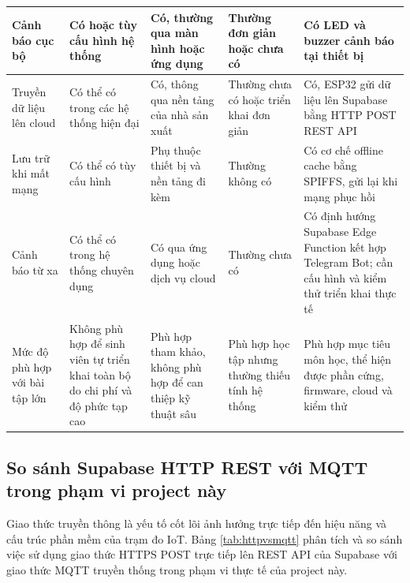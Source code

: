 \begin{table}[H]
\begin{tabularx}{\textwidth}{|p{3.2cm}|X|X|X|X|}
Cảnh báo cục bộ 
& Có hoặc tùy cấu hình hệ thống 
& Có, thường qua màn hình hoặc ứng dụng 
& Thường đơn giản hoặc chưa có 
& Có LED và buzzer cảnh báo tại thiết bị \\
\hline

Truyền dữ liệu lên cloud 
& Có thể có trong các hệ thống hiện đại 
& Có, thông qua nền tảng của nhà sản xuất 
& Thường chưa có hoặc triển khai đơn giản 
& Có, ESP32 gửi dữ liệu lên Supabase bằng HTTP POST REST API \\
\hline

Lưu trữ khi mất mạng 
& Có thể có tùy cấu hình 
& Phụ thuộc thiết bị và nền tảng đi kèm 
& Thường không có 
& Có cơ chế offline cache bằng SPIFFS, gửi lại khi mạng phục hồi \\
\hline

Cảnh báo từ xa 
& Có thể có trong hệ thống chuyên dụng 
& Có qua ứng dụng hoặc dịch vụ cloud 
& Thường chưa có 
& Có định hướng Supabase Edge Function kết hợp Telegram Bot; cần cấu hình và kiểm thử triển khai thực tế \\
\hline

Mức độ phù hợp với bài tập lớn 
& Không phù hợp để sinh viên tự triển khai toàn bộ do chi phí và độ phức tạp cao 
& Phù hợp tham khảo, không phù hợp để can thiệp kỹ thuật sâu 
& Phù hợp học tập nhưng thường thiếu tính hệ thống 
& Phù hợp mục tiêu môn học, thể hiện được phần cứng, firmware, cloud và kiểm thử \\
\hline

\end{tabularx}
\end{table}

\subsection{So sánh Supabase HTTP REST với MQTT trong phạm vi project này}
Giao thức truyền thông là yếu tố cốt lõi ảnh hưởng trực tiếp đến hiệu năng và cấu trúc phần mềm của trạm đo IoT. Bảng \ref{tab:httpvsmqtt} phân tích và so sánh việc sử dụng giao thức HTTPS POST trực tiếp lên REST API của Supabase với giao thức MQTT truyền thống trong phạm vi thực tế của project này.

